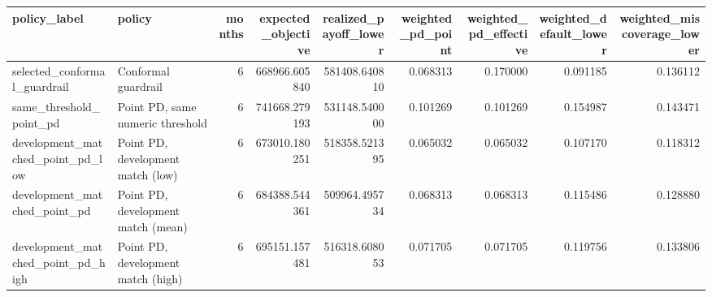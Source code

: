 \begin{tabular}{llrrrrrrr}
\toprule
policy\_label & policy & months & expected\_objective & realized\_payoff\_lower & weighted\_pd\_point & weighted\_pd\_effective & weighted\_default\_lower & weighted\_miscoverage\_lower \\
\midrule
selected\_conformal\_guardrail & Conformal guardrail & 6 & 668966.605840 & 581408.640810 & 0.068313 & 0.170000 & 0.091185 & 0.136112 \\
same\_threshold\_point\_pd & Point PD, same numeric threshold & 6 & 741668.279193 & 531148.540000 & 0.101269 & 0.101269 & 0.154987 & 0.143471 \\
development\_matched\_point\_pd\_low & Point PD, development match (low) & 6 & 673010.180251 & 518358.521395 & 0.065032 & 0.065032 & 0.107170 & 0.118312 \\
development\_matched\_point\_pd & Point PD, development match (mean) & 6 & 684388.544361 & 509964.495734 & 0.068313 & 0.068313 & 0.115486 & 0.128880 \\
development\_matched\_point\_pd\_high & Point PD, development match (high) & 6 & 695151.157481 & 516318.608053 & 0.071705 & 0.071705 & 0.119756 & 0.133806 \\
\bottomrule
\end{tabular}
